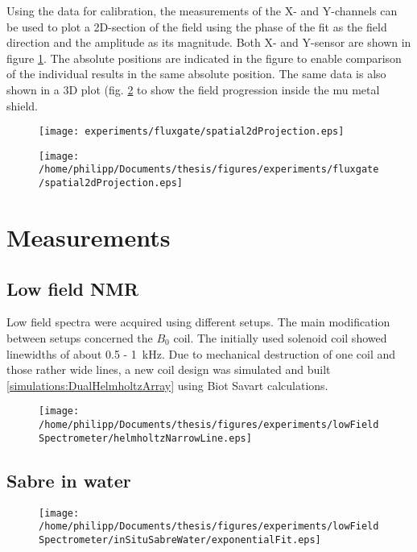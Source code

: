 		Using the data for calibration, the measurements of the X- and Y-channels can be used to plot a 2D-section of the field using the phase of the fit as the field direction and the amplitude as its magnitude. Both X- and Y-sensor are shown in figure \ref{fig:results:fluxgate:plotSpatial2d}. The absolute positions are indicated in the figure to enable comparison of the individual results in the same absolute position. The same data is also shown in a 3D plot (fig. \ref{fig:results:fluxgate:plotSpatial3d} to show the field progression inside the mu metal shield.
		\begin{figure}[t]
			\label{fig:results:fluxgate:plotSpatial2d}
			\centering
			\texttt{[image: experiments/fluxgate/spatial2dProjection.eps]}
		\end{figure}
		\begin{figure}[t]
			\label{fig:results:fluxgate:plotSpatial3d}
			\centering
			\texttt{[image: /home/philipp/Documents/thesis/figures/experiments/fluxgate/spatial2dProjection.eps]}
		\end{figure}
\section{Measurements}
	\subsection{Low field NMR}
	Low field spectra were acquired using different setups. The main modification between setups concerned the $B_0$ coil. The initially used solenoid coil showed linewidths of about 0.5 - \SI{1}{\kilo\hertz}. Due to mechanical destruction of one coil and those rather wide lines, a new coil design was simulated and built \ref{simulations:DualHelmholtzArray} using Biot Savart calculations.
	\begin{figure}[h] 
		\centering
	\end{figure}
	\begin{figure}[h]
		\centering
		\texttt{[image: /home/philipp/Documents/thesis/figures/experiments/lowFieldSpectrometer/helmholtzNarrowLine.eps]}
	\end{figure}
	\subsection{Sabre in water}
	\begin{figure}[h]
	\end{figure}
	\begin{figure}[h]
		\centering
		\texttt{[image: /home/philipp/Documents/thesis/figures/experiments/lowFieldSpectrometer/inSituSabreWater/exponentialFit.eps]}
	\end{figure}
